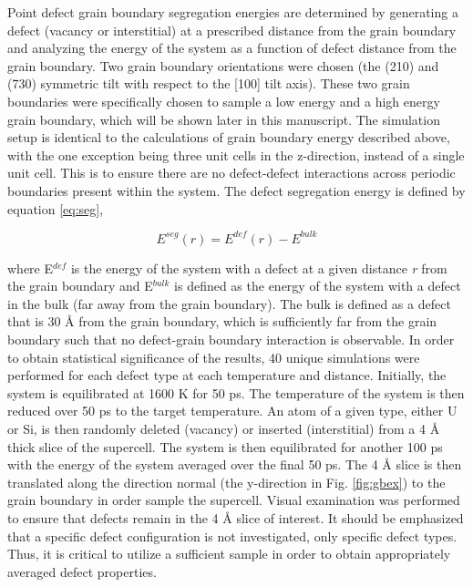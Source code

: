\documentclass[review]{elsarticle}
\begin{document}
Point defect grain boundary segregation energies are determined by generating a defect (vacancy or interstitial) at a prescribed distance from the grain boundary and analyzing the energy of the system as a function of defect distance from the grain boundary. Two grain boundary orientations were chosen (the (210) and (730) symmetric tilt with respect to the [100] tilt axis). These two grain boundaries were specifically chosen to sample a low energy and a high energy grain boundary, which will be shown later in this manuscript. The simulation setup is identical to the calculations of grain boundary energy described above, with the one exception being three unit cells in the z-direction, instead of a single unit cell. This is to ensure there are no defect-defect interactions across periodic boundaries present within the system. The defect segregation energy is defined by equation \ref{eq:seg},

\begin{equation}
\label{eq:seg}
E^{seg}(r)= E^{def}(r) - E^{bulk}
\end{equation}

where E$^{def}$ is the energy of the system with a defect at a given distance \textit{r} from the grain boundary and E$^{bulk}$ is defined as the energy of the system with a defect in the bulk (far away from the grain boundary). The bulk is defined as a defect that is 30 {\AA} from the grain boundary, which is sufficiently far from the grain boundary such that no defect-grain boundary interaction is observable. In order to obtain statistical significance of the results, 40 unique simulations were performed for each defect type at each temperature and distance. Initially, the system is equilibrated at 1600 K for 50 ps. The temperature of the system is then reduced over 50 ps to the target temperature. An atom of a given type, either U or Si, is then randomly deleted (vacancy) or inserted (interstitial) from a 4 {\AA} thick slice of the supercell. The system is then equilibrated for another 100 ps with the energy of the system averaged over the final 50 ps. The 4 {\AA} slice is then translated along the direction normal (the y-direction in Fig. \ref{fig:gbex}) to the grain boundary in order sample the supercell. Visual examination was performed to ensure that defects remain in the 4 {\AA} slice of interest. It should be emphasized that a specific defect configuration is not investigated, only specific defect types. Thus, it is critical to utilize a sufficient sample in order to obtain appropriately averaged defect properties.
\end{document}
